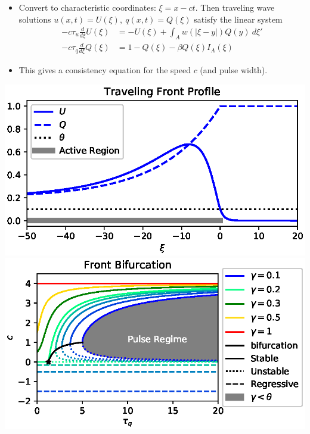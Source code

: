 \documentclass[landscape,final]{baposter}
\begin{document}
\begin{poster}
{}
{
	\begin{itemize}
		\item Convert to characteristic coordinates: $\xi = x - c t$. Then traveling wave solutions $u(x,t) = U(\xi), \ q(x,t) = Q(\xi)$ satisfy the linear system
			\begin{align*}
				-c\tau_u \frac{d}{d \xi} U(\xi) &= -U(\xi) + \int_A w(|\xi - y|) Q(y) \ d\xi' \\
				-c \tau_q \frac{d}{d \xi} Q(\xi) &= 1 - Q(\xi) - \beta Q(\xi) I_A(\xi)
			\end{align*}
		\item This gives a consistency equation for the speed $c$ (and pulse width).
	\end{itemize}
	\vspace{-.5cm}
	\begin{center}
		\includegraphics[width=.85\linewidth, trim={0cm, .6cm, 0cm, .2cm}, clip=true]{front_profile}
		\includegraphics[width=.9\linewidth, trim={0cm, .4cm, 0cm, .2cm}, clip=true]{front_bifurcation}
	\end{center}
}



\end{poster}
\end{document}
